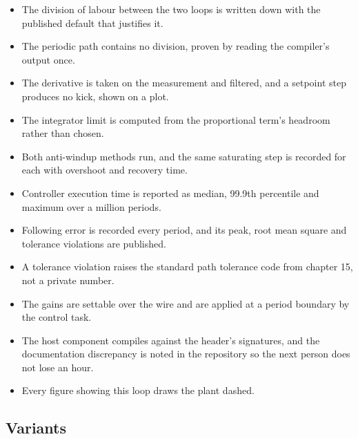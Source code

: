 \begin{itemize}
\item The division of labour between the two loops is written down with the
published default that justifies it.
\item The periodic path contains no division, proven by reading the compiler's
output once.
\item The derivative is taken on the measurement and filtered, and a setpoint
step produces no kick, shown on a plot.
\item The integrator limit is computed from the proportional term's headroom
rather than chosen.
\item Both anti-windup methods run, and the same saturating step is recorded for
each with overshoot and recovery time.
\item Controller execution time is reported as median, 99.9th percentile and
maximum over a million periods.
\item Following error is recorded every period, and its peak, root mean square
and tolerance violations are published.
\item A tolerance violation raises the standard path tolerance code from chapter
15, not a private number.
\item The gains are settable over the wire and are applied at a period boundary
by the control task.
\item The host component compiles against the header's signatures, and the
documentation discrepancy is noted in the repository so the next person does not
lose an hour.
\item Every figure showing this loop draws the plant dashed.
\end{itemize}

\subsection*{Variants}

